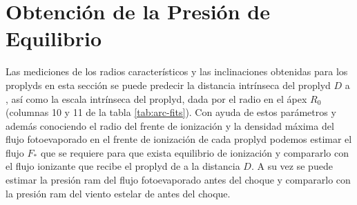 \section{Obtención de la Presión de Equilibrio}

Las mediciones de los radios característicos y las inclinaciones obtenidas para los proplyds en esta sección se puede predecir la distancia intrínseca del proplyd $D$ a \thC{}, así como la escala intrínseca del proplyd, dada por el radio en el ápex $R_0$ (columnas 10 y 11 de la tabla \ref{tab:arc-fits}). Con ayuda de estos parámetros y además conociendo el radio del frente de ionización y la densidad máxima del flujo fotoevaporado en el frente de ionización de cada proplyd podemos estimar el flujo $F_*$ que se requiere para que exista equilibrio de ionización y compararlo con el flujo ionizante que recibe el proplyd de \thC{} a la distancia $D$. A su vez se puede estimar la presión ram del flujo fotoevaporado antes del choque y compararlo con la presión ram del viento estelar de \thC{} antes del choque. 




